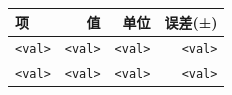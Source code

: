 \begin{tabular}{lrrr}
\toprule
\textbf{项} & \textbf{值} & \textbf{单位} & \textbf{误差(±)} \\\midrule
\texttt{<val>} & \texttt{<val>} & \texttt{<val>} & \texttt{<val>} \\
\texttt{<val>} & \texttt{<val>} & \texttt{<val>} & \texttt{<val>} \\\bottomrule
\end{tabular}
